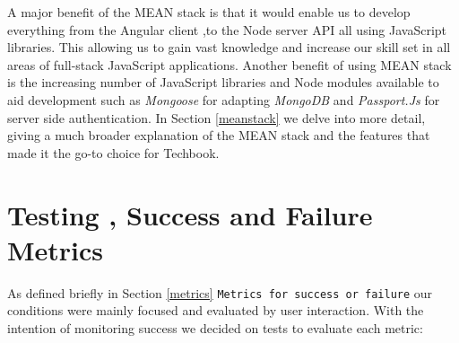 A major benefit of the MEAN stack is that it would enable us to develop everything from the Angular client ,to the Node server API all using JavaScript libraries. This allowing us to gain vast knowledge and increase our skill set in all areas of full-stack JavaScript applications. Another benefit of using MEAN stack is the increasing number of JavaScript libraries and Node modules available to aid development such as \textit{Mongoose} for adapting \textit{MongoDB} and \textit{Passport.Js} for server side authentication. In Section \ref{meanstack} we delve into more detail, giving a much broader explanation of the MEAN stack and the features that made it the go-to choice for Techbook.


\section{Testing , Success and Failure Metrics} 
As defined briefly in Section \ref{metrics} \texttt{Metrics for success or failure} our conditions were mainly focused and evaluated by user interaction. With the intention of monitoring  success we decided on tests to evaluate each metric:

